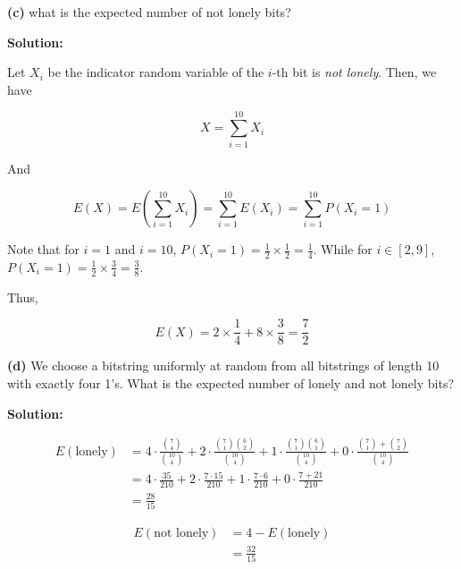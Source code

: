 \documentclass[11pt]{article}
\renewcommand\part[1]{\vspace{.10in}\textbf{(#1)}}
\newcommand{\solution}{\vspace{.10in}\textbf{Solution: }}
\begin{document}
\part{c} what is the expected number of not lonely bits?

\solution

Let $X_i$ be the indicator random variable of the $i$-th bit is \textit{not lonely}.
Then, we have

\begin{equation}
    X = \sum_{i=1}^{10} X_i
\end{equation}

And

\begin{equation}
    E(X) = E\left(\sum_{i=1}^{10} X_i\right) = \sum_{i=1}^{10} E(X_i) = \sum_{i=1}^{10} P(X_i = 1)
\end{equation}

Note that for $i = 1$ and $i = 10$, $P(X_i = 1) = \frac{1}{2} \times \frac{1}{2} = \frac{1}{4}$.
While for $i \in [2, 9]$, $P(X_i = 1) = \frac{1}{2} \times \frac{3}{4} = \frac{3}{8}$.

Thus,

\begin{equation}
    E(X) = 2 \times \frac{1}{4} + 8 \times \frac{3}{8} = \frac{7}{2}
\end{equation}

\part{d} We choose a bitstring uniformly at random from all bitstrings of length 10 with exactly four 1's. What is the expected number of lonely and not lonely bits?

\solution

\begin{align*}
    E(\text{lonely}) &= 4\cdot\frac{\binom{7}{4}}{\binom{10}{4}} + 2 \cdot \frac{\binom{7}{1}\binom{6}{2}}{\binom{10}{4}} + 1 \cdot \frac{\binom{7}{1}\binom{6}{1}}{\binom{10}{4}} + 0 \cdot \frac{\binom{7}{1} + \binom{7}{2}}{\binom{10}{4}} \\
        &= 4\cdot \frac{35}{210} + 2 \cdot \frac{7 \cdot 15}{210} + 1 \cdot \frac{7 \cdot 6}{210} + 0 \cdot \frac{7 + 21}{210} \\
        &= \frac{28}{15}
\end{align*}

\begin{align*}
    E(\text{not lonely}) &= 4 - E(\text{lonely}) \\
                         &= \frac{32}{15}
\end{align*}
\end{document}
